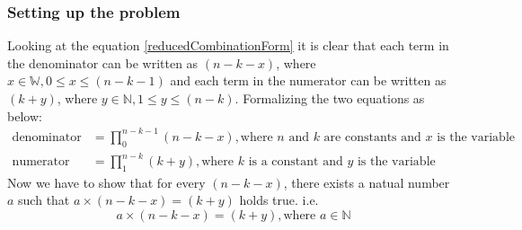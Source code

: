\documentclass[10pt, twoside]{article}
\begin{document}
\subsubsection{Setting up the problem}\label{settingUpTheProblem}
Looking at the equation \eqref{reducedCombinationForm} it is clear that each term in the denominator can be written as $(n-k-x)$, where $x \in \mathbb{W}, 0 \leq x \leq (n-k-1)$ and each term in the numerator can be written as $(k+y)$, where $y \in \mathbb{N}, 1 \leq y \leq (n-k)$. Formalizing the two equations as below:
\begin{align}
	\text{denominator} &= \prod_{0}^{n-k-1}(n-k-x), \text{where $n$ and $k$ are constants and $x$ is the variable} \label{denominator}\\
	\text{numerator} &= \prod_{1}^{n-k}(k+y), \text{where $k$ is a constant and $y$ is the variable} \label{numerator}
\end{align}
Now we have to show that for every $(n-k-x)$, there exists a natual number \textbf{$a$} such that $a \times (n-k-x) = (k+y)$ holds true. i.e.
\begin{equation}
	a \times (n-k-x) = (k+y), \text{where $a \in \mathbb{N}$}  \label{MultipleOfAisAnswer}
\end{equation}
\end{document}

